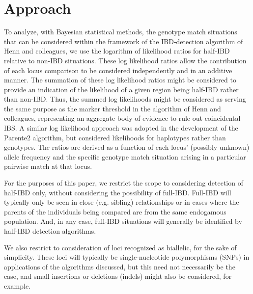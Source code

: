 \documentclass{article}
\begin{document}
\section{Approach}
To analyze, with Bayesian statistical methods, the genotype match situations that can be considered within the framework of the IBD-detection algorithm of Henn and colleagues, we use the logarithm of likelihood ratios for half-IBD relative to non-IBD situations. These log likelihood ratios allow the contribution of each locus comparison to be considered independently and in an additive manner. The summation of these log likelihood ratios might be considered to provide an indication of the likelihood of a given region being half-IBD rather than non-IBD. Thus, the summed log likelihoods might be considered as serving the same purpose as the marker threshold in the algorithm of Henn and colleagues, representing an aggregate body of evidence to rule out coincidental IBS. A similar log likelihood approach was adopted in the development of the Parente2 algorithm, but considered likelihoods for haplotypes rather than genotypes.\citep{Parente2} The ratios are derived as a function of each locus' (possibly unknown) allele frequency and the specific genotype match situation arising in a particular pairwise match at that locus.

For the purposes of this paper, we restrict the scope to considering detection of half-IBD only, without considering the possibility of full-IBD. Full-IBD will typically only be seen in close (e.g. sibling) relationships or in cases where the parents of the individuals being compared are from the same endogamous population. And, in any case, full-IBD situations will generally be identified by half-IBD detection algorithms.

We also restrict to consideration of loci recognized as biallelic, for the sake of simplicity. These loci will typically be single-nucleotide polymorphisms (SNPs) in applications of the algorithms discussed, but this need not necessarily be the case, and small insertions or deletions (indels) might also be considered, for example.
\end{document}
